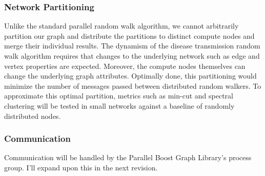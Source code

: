 \subsubsection{Network Partitioning}

Unlike the standard parallel random walk algorithm, we cannot arbitrarily partition our graph and distribute the partitions to distinct compute nodes and merge their individual results. The dynamism of the disease transmission random walk algorithm requires that changes to the underlying network such as edge and vertex properties are expected. Moreover, the compute nodes themselves can change the underlying graph attributes. Optimally done, this partitioning would minimize the number of messages passed between distributed random walkers. To approximate this optimal partition, metrics such as min-cut and spectral clustering will be tested in small networks against a baseline of randomly distributed nodes.

\subsubsection{Communication}

Communication will be handled by the Parallel Boost Graph Library's process group. I'll expand upon this in the next revision. 


